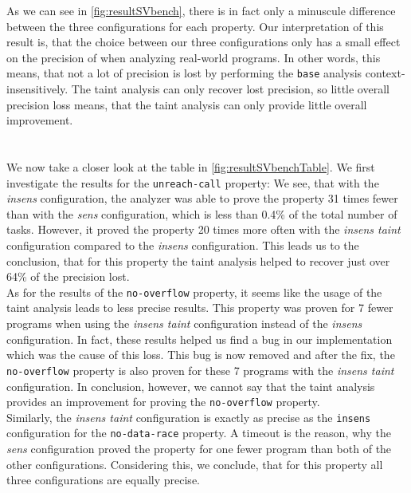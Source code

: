       \noindent As we can see in \autoref{fig:resultSVbench}, there is in fact only a minuscule difference between the three configurations for each property. Our interpretation of this result is, that the choice between our three configurations only has a small effect on the precision of \gob when analyzing real-world programs. In other words, this means, that not a lot of precision is lost by performing the \texttt{base} analysis context-insensitively. The taint analysis can only recover lost precision, so little overall precision loss means, that the taint analysis can only provide little overall improvement.\\
      \\
      \\
      We now take a closer look at the table in \autoref{fig:resultSVbenchTable}. We first investigate the results for the \texttt{unreach-call} property: We see, that with the \textit{insens} configuration, the analyzer was able to prove the property 31 times fewer than with the \textit{sens} configuration, which is less than 0.4\% of the total number of tasks. However, it proved the property 20 times more often with the \textit{insens taint} configuration compared to the \textit{insens} configuration. This leads us to the conclusion, that for this property the taint analysis helped to recover just over 64\% of the precision lost.\\
      As for the results of the \texttt{no-overflow} property, it seems like the usage of the taint analysis leads to less precise results. This property was proven for 7 fewer programs when using the \textit{insens taint} configuration instead of the \textit{insens} configuration. In fact, these results helped us find a bug in our implementation which was the cause of this loss. This bug is now removed and after the fix, the \texttt{no-overflow} property is also proven for these 7 programs with the \textit{insens taint} configuration. In conclusion, however, we cannot say that the taint analysis provides an improvement for proving the \texttt{no-overflow} property.\\
      Similarly, the \textit{insens taint} configuration is exactly as precise as the \texttt{insens} configuration for the \texttt{no-data-race} property. A timeout is the reason, why the \textit{sens} configuration proved the property for one fewer program than both of the other configurations. Considering this, we conclude, that for this property all three configurations are equally precise.\\
      \\
